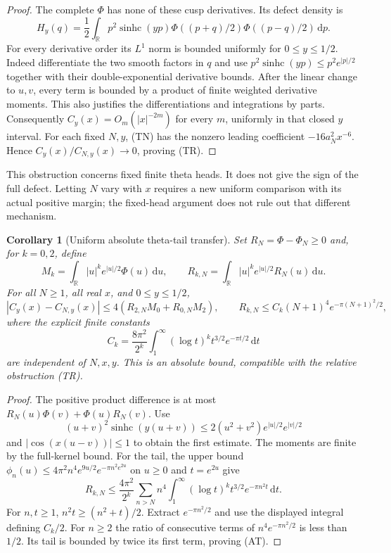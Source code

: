 \documentclass[11pt]{article}
\newtheorem{corollary}[theorem]{Corollary}
\theoremstyle{remark}\newtheorem{remark}[theorem]{Remark}
\newcommand{\R}{\mathbb R}
\newcommand{\dd}{\,\mathrm d}
\newcommand{\sinhc}{\operatorname{sinhc}}
\begin{document}
\begin{proof}
The complete $\Phi$ has none of these cusp derivatives.
Its defect density is
\[
 H_y(q)=\frac12\int_\R p^2\sinhc(yp)
       \Phi((p+q)/2)\Phi((p-q)/2)\dd p.
\]
For every derivative order its $L^1$ norm is bounded
uniformly for $0\le y\le1/2$. Indeed differentiate the two
smooth factors in $q$ and use
$p^2\sinhc(yp)\le p^2e^{|p|/2}$ together with their
double-exponential derivative bounds. After the linear
change to $u,v$, every term is bounded by a product of
finite weighted derivative moments. This also justifies
the differentiations and integrations by parts.
Consequently $C_y(x)=O_m(|x|^{-2m})$ for every $m$,
uniformly in that closed $y$ interval.
For each fixed $N,y$, (TN) has the nonzero leading
coefficient $-16a_N^2x^{-6}$. Hence
$C_y(x)/C_{N,y}(x)\to0$, proving (TR).
\end{proof}

This obstruction concerns fixed finite theta heads. It
does not give the sign of the full defect. Letting
$N$ vary with $x$ requires a new uniform comparison
with its actual positive margin; the fixed-head argument
does not rule out that different mechanism.

\begin{corollary}[Uniform absolute theta-tail transfer]
\label{cor:theta-tail-transfer}
Set $R_N=\Phi-\Phi_N\ge0$ and, for $k=0,2$, define
\[
 M_k=\int_\R |u|^k e^{|u|/2}\Phi(u)\dd u,\qquad
 R_{k,N}=\int_\R |u|^k e^{|u|/2}R_N(u)\dd u.
\]
For all $N\ge1$, all real $x$, and $0\le y\le1/2$,
\[
 |C_y(x)-C_{N,y}(x)|
       \le4(R_{2,N}M_0+R_{0,N}M_2),\qquad
 R_{k,N}\le C_k(N+1)^4e^{-\pi(N+1)^2/2},              \tag{AT}
\]
where the explicit finite constants
\[
 C_k=\frac{8\pi^2}{2^k}\int_1^\infty
             (\log t)^k t^{3/2}e^{-\pi t/2}\dd t
\]
are independent of $N,x,y$.
This is an absolute bound, compatible with the relative
obstruction (TR).
\end{corollary}
\begin{proof}
The positive product difference is at most
$R_N(u)\Phi(v)+\Phi(u)R_N(v)$.
Use
\[
 (u+v)^2\sinhc(y(u+v))
       \le2(u^2+v^2)e^{|u|/2}e^{|v|/2}
\]
and $|\cos(x(u-v))|\le1$ to obtain the first estimate.
The moments are finite by the full-kernel bound.
For the tail, the upper bound
$\phi_n(u)\le4\pi^2n^4e^{9u/2}e^{-\pi n^2e^{2u}}$
on $u\ge0$ and $t=e^{2u}$ give
\[
 R_{k,N}\le\frac{4\pi^2}{2^k}\sum_{n>N}n^4
       \int_1^\infty(\log t)^k t^{3/2}e^{-\pi n^2t}\dd t.
\]
For $n,t\ge1$, $n^2t\ge(n^2+t)/2$. Extract
$e^{-\pi n^2/2}$ and use the displayed integral defining
$C_k/2$. For $n\ge2$ the ratio of consecutive terms of
$n^4e^{-\pi n^2/2}$ is less than $1/2$.
Its tail is bounded by twice its first term, proving (AT).
\end{proof}
\end{document}
